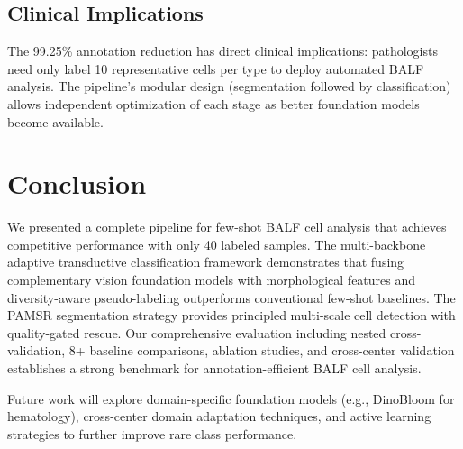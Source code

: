 \documentclass[preprint,review,12pt]{elsarticle}
\begin{document}
\subsection{Clinical Implications}

The 99.25\% annotation reduction has direct clinical implications: pathologists need only label 10 representative cells per type to deploy automated BALF analysis. The pipeline's modular design (segmentation followed by classification) allows independent optimization of each stage as better foundation models become available.


\section{Conclusion}
\label{sec:conclusion}

We presented a complete pipeline for few-shot BALF cell analysis that achieves competitive performance with only 40 labeled samples. The multi-backbone adaptive transductive classification framework demonstrates that fusing complementary vision foundation models with morphological features and diversity-aware pseudo-labeling outperforms conventional few-shot baselines. The PAMSR segmentation strategy provides principled multi-scale cell detection with quality-gated rescue. Our comprehensive evaluation including nested cross-validation, 8+ baseline comparisons, ablation studies, and cross-center validation establishes a strong benchmark for annotation-efficient BALF cell analysis.

Future work will explore domain-specific foundation models (e.g., DinoBloom for hematology), cross-center domain adaptation techniques, and active learning strategies to further improve rare class performance.


\end{document}
